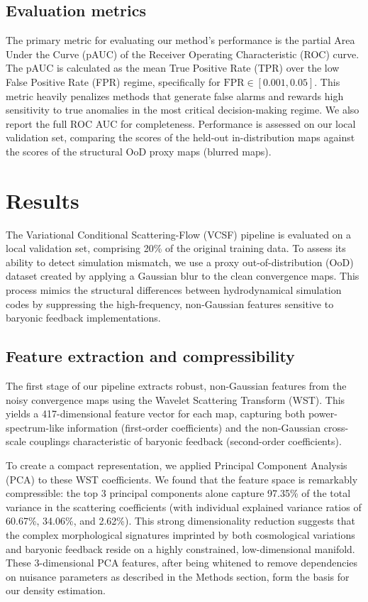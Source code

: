 \documentclass[]{article}
\begin{document}
\subsection{Evaluation metrics}
The primary metric for evaluating our method's performance is the partial Area Under the Curve (pAUC) of the Receiver Operating Characteristic (ROC) curve. The pAUC is calculated as the mean True Positive Rate (TPR) over the low False Positive Rate (FPR) regime, specifically for $\text{FPR} \in [0.001, 0.05]$. This metric heavily penalizes methods that generate false alarms and rewards high sensitivity to true anomalies in the most critical decision-making regime. We also report the full ROC AUC for completeness. Performance is assessed on our local validation set, comparing the scores of the held-out in-distribution maps against the scores of the structural OoD proxy maps (blurred maps).

\section{Results}
\label{sec:results}
The Variational Conditional Scattering-Flow (VCSF) pipeline is evaluated on a local validation set, comprising 20\% of the original training data. To assess its ability to detect simulation mismatch, we use a proxy out-of-distribution (OoD) dataset created by applying a Gaussian blur to the clean convergence maps. This process mimics the structural differences between hydrodynamical simulation codes by suppressing the high-frequency, non-Gaussian features sensitive to baryonic feedback implementations.

\subsection{Feature extraction and compressibility}
The first stage of our pipeline extracts robust, non-Gaussian features from the noisy convergence maps using the Wavelet Scattering Transform (WST). This yields a 417-dimensional feature vector for each map, capturing both power-spectrum-like information (first-order coefficients) and the non-Gaussian cross-scale couplings characteristic of baryonic feedback (second-order coefficients).

To create a compact representation, we applied Principal Component Analysis (PCA) to these WST coefficients. We found that the feature space is remarkably compressible: the top 3 principal components alone capture 97.35\% of the total variance in the scattering coefficients (with individual explained variance ratios of 60.67\%, 34.06\%, and 2.62\%). This strong dimensionality reduction suggests that the complex morphological signatures imprinted by both cosmological variations and baryonic feedback reside on a highly constrained, low-dimensional manifold. These 3-dimensional PCA features, after being whitened to remove dependencies on nuisance parameters as described in the Methods section, form the basis for our density estimation.
\end{document}
